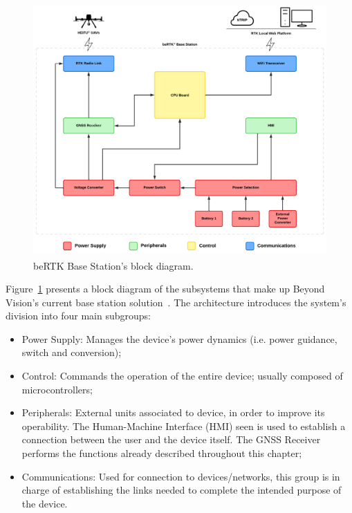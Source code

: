 \begin{figure}[h]
	\centering
	\includegraphics[width=1.0\textwidth]{Chapters/Figures/architecture_original_v2.pdf}
	\caption{beRTK\textsuperscript{\textregistered} Base Station's block diagram.}
	\label{fig:architecture_original}
\end{figure}

Figure~\ref{fig:architecture_original} presents a block diagram of the subsystems that make up Beyond Vision's current base station solution~\cite{beRTK_2022}.
The architecture introduces the system's division into four main subgroups:
\begin{itemize}
    \item Power Supply: Manages the device's power dynamics (i.e. power guidance, switch and conversion);
    \item Control: Commands the operation of the entire device; usually composed of microcontrollers;
    \item Peripherals: External units associated to device, in order to improve its operability. The Human-Machine Interface (HMI) seen is used to establish a connection between the user and the device itself. The GNSS Receiver performs the functions already described throughout this chapter;
    \item Communications: Used for connection to devices/networks, this group is in charge of establishing the links needed to complete the intended purpose of the device.
\end{itemize}

